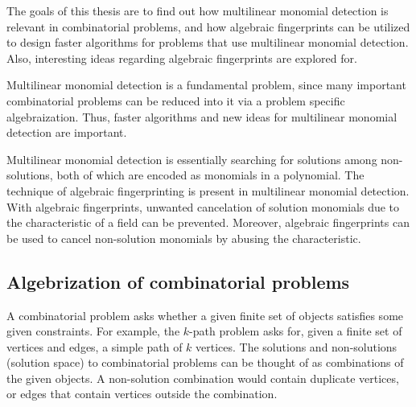 The goals of this thesis are to find out how multilinear monomial detection is relevant in 
combinatorial problems, and how algebraic fingerprints can be utilized to design faster 
algorithms for problems that use multilinear monomial detection. Also, interesting ideas 
regarding algebraic fingerprints are explored for.

Multilinear monomial detection 
is a fundamental problem, since many important combinatorial problems can be reduced into it 
via a problem specific algebraization. Thus, faster algorithms and new ideas for multilinear monomial detection 
are important.

Multilinear monomial detection is essentially searching for solutions among non-solutions, 
both of which are encoded as monomials in a polynomial. 
The technique of algebraic fingerprinting is present in multilinear monomial detection. 
With algebraic fingerprints, unwanted cancelation of solution monomials due to the characteristic of a field can be prevented. 
Moreover, algebraic fingerprints can be used to cancel non-solution monomials by abusing the characteristic.


\subsection{Algebrization of combinatorial problems}

A combinatorial problem asks whether a given finite set of objects satisfies some given constraints. 
For example, the $k$-path problem asks for, given a finite set of vertices and edges, 
a simple path of $k$ vertices. The solutions and non-solutions (solution space) to combinatorial problems can be thought of as 
combinations of the given objects.
A non-solution combination would contain duplicate vertices, or edges that
contain vertices outside the combination.

